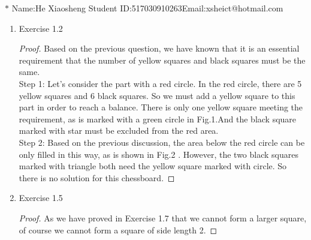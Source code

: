 \documentclass[12pt,a4paper]{article}
\theoremstyle{definition}
\begin{document}
	\noindent
	
	\noindent{}
	\begin{center}
		
		
		\footnotesize{\color{blue}$*$ Name:He Xiaosheng \quad Student ID:517030910263\quad Email:xsheict@hotmail.com}
	\end{center}
	
	\begin{enumerate}
		\item
		Exercise 1.2
		\begin{proof}
			Based on the previous question, we have known that it is an essential requirement that the number of yellow squares and black squares must be the same.\\
			Step 1: Let's consider the part with a red circle. In the red circle, there are 5 yellow squares and 6 black squares. So we must add a yellow square to this part in order to reach a balance. There is only one yellow square meeting the requirement, as is marked with a green circle in Fig.1.And the black square marked with star must be excluded from the red area.\\
			Step 2: Based on the previous discussion, the area below the red circle can be only filled in this way, as is shown in Fig.2 . However, the two black squares marked with triangle both need the yellow square marked with circle. So there is no solution for this chessboard.
		\end{proof}
		
		\item
		Exercise 1.5
		\begin{proof}
			As we have proved in Exercise 1.7 that we cannot form a larger square, of course we cannot form a square of side length 2.
		\end{proof}
		

\end{enumerate}
\end{document}
